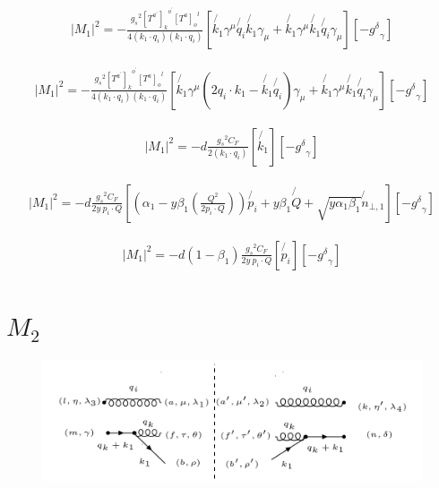 \begin{equation}
\begin{split}
|M_1|^2=-\frac{{g_s}^2 {[T^{a^{\prime}}]_k}^{o^{\prime}} {[T^a]_{o}}^{l}}{4(k_1 \cdot q_i)(k_1 \cdot q_i)}
[\not{k_1}{\gamma}^{\mu}\not{q_i}\not{k_1}{\gamma}_{{\mu}}+\not{k_1}{\gamma}^{\mu}\not{k_1}\not{q_i} {\gamma}_{{\mu}}][-{g^{\delta}}_{\gamma}]
\end{split}
\end{equation}

\begin{equation}
\begin{split}
|M_1|^2=-\frac{{g_s}^2 {[T^{a^{\prime}}]_k}^{o^{\prime}} {[T^a]_{o}}^{l}}{4(k_1 \cdot q_i)(k_1 \cdot q_i)}
[\not{k_1}{\gamma}^{\mu}(2q_i \cdot k_1 -\not{k_1}\not{q_i}){\gamma}_{{\mu}}+\not{k_1}{\gamma}^{\mu}\not{k_1}\not{q_i} {\gamma}_{{\mu}}][-{g^{\delta}}_{\gamma}]
\end{split}
\end{equation}

\begin{equation}
\begin{split}
|M_1|^2=-d\frac{{g_s}^2 C_F}{2(k_1 \cdot q_i)}
[\not{k_1}][-{g^{\delta}}_{\gamma}]
\end{split}
\end{equation}

\begin{equation}
\begin{split}
|M_1|^2=-d\frac{{g_s}^2 C_F}{2y\:p_i \cdot Q}
[(\alpha_1 -y\beta_1(\frac{Q^2}{2p_i \cdot Q})) \not{p_i} + y\beta_1\not{Q} + \sqrt{y\alpha_1\beta_1}\not{n}_{\bot,1}][-{g^{\delta}}_{\gamma}]
\end{split}
\end{equation}

\begin{equation}
\begin{split}
|M_1|^2=-d(1-\beta_1)\frac{{g_s}^2 C_F}{2y \:p_i \cdot Q}
[  \not{p_i}][-{g^{\delta}}_{\gamma}]
\end{split}
\end{equation}

\pagebreak

\section{$ M_2 $}
\begin{figure}[ht!]
\centering
\includegraphics[scale=0.7]{images/GQ/M2Squer.png}
\end{figure}

